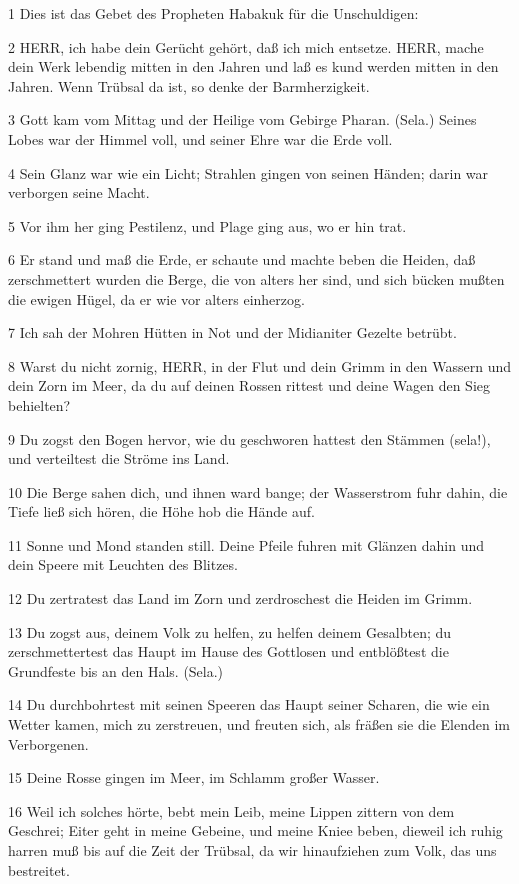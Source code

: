 \par 1 Dies ist das Gebet des Propheten Habakuk für die Unschuldigen:
\par 2 HERR, ich habe dein Gerücht gehört, daß ich mich entsetze. HERR, mache dein Werk lebendig mitten in den Jahren und laß es kund werden mitten in den Jahren. Wenn Trübsal da ist, so denke der Barmherzigkeit.
\par 3 Gott kam vom Mittag und der Heilige vom Gebirge Pharan. (Sela.) Seines Lobes war der Himmel voll, und seiner Ehre war die Erde voll.
\par 4 Sein Glanz war wie ein Licht; Strahlen gingen von seinen Händen; darin war verborgen seine Macht.
\par 5 Vor ihm her ging Pestilenz, und Plage ging aus, wo er hin trat.
\par 6 Er stand und maß die Erde, er schaute und machte beben die Heiden, daß zerschmettert wurden die Berge, die von alters her sind, und sich bücken mußten die ewigen Hügel, da er wie vor alters einherzog.
\par 7 Ich sah der Mohren Hütten in Not und der Midianiter Gezelte betrübt.
\par 8 Warst du nicht zornig, HERR, in der Flut und dein Grimm in den Wassern und dein Zorn im Meer, da du auf deinen Rossen rittest und deine Wagen den Sieg behielten?
\par 9 Du zogst den Bogen hervor, wie du geschworen hattest den Stämmen (sela!), und verteiltest die Ströme ins Land.
\par 10 Die Berge sahen dich, und ihnen ward bange; der Wasserstrom fuhr dahin, die Tiefe ließ sich hören, die Höhe hob die Hände auf.
\par 11 Sonne und Mond standen still. Deine Pfeile fuhren mit Glänzen dahin und dein Speere mit Leuchten des Blitzes.
\par 12 Du zertratest das Land im Zorn und zerdroschest die Heiden im Grimm.
\par 13 Du zogst aus, deinem Volk zu helfen, zu helfen deinem Gesalbten; du zerschmettertest das Haupt im Hause des Gottlosen und entblößtest die Grundfeste bis an den Hals. (Sela.)
\par 14 Du durchbohrtest mit seinen Speeren das Haupt seiner Scharen, die wie ein Wetter kamen, mich zu zerstreuen, und freuten sich, als fräßen sie die Elenden im Verborgenen.
\par 15 Deine Rosse gingen im Meer, im Schlamm großer Wasser.
\par 16 Weil ich solches hörte, bebt mein Leib, meine Lippen zittern von dem Geschrei; Eiter geht in meine Gebeine, und meine Kniee beben, dieweil ich ruhig harren muß bis auf die Zeit der Trübsal, da wir hinaufziehen zum Volk, das uns bestreitet.
